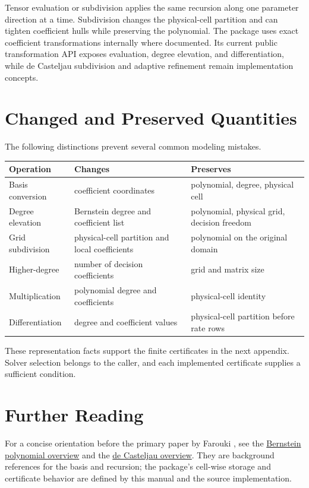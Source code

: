 Tensor evaluation or subdivision applies the same recursion along one parameter direction at a time. Subdivision changes the physical-cell partition and can tighten coefficient hulls while preserving the polynomial. The package uses exact coefficient transformations internally where documented. Its current public transformation API exposes evaluation, degree elevation, and differentiation, while de Casteljau subdivision and adaptive refinement remain implementation concepts.

\section{Changed and Preserved Quantities}

The following distinctions prevent several common modeling mistakes.

\begin{tabularx}{\textwidth}{@{}p{}Y Y@{}}
\toprule
Operation & Changes & Preserves \\
\midrule
Basis conversion & coefficient coordinates & polynomial, degree, physical cell \\
Degree elevation & Bernstein degree and coefficient list & polynomial, physical grid, decision freedom \\
Grid subdivision & physical-cell partition and local coefficients & polynomial on the original domain \\
Higher-degree  & number of decision coefficients & grid and matrix size \\
Multiplication & polynomial degree and coefficients & physical-cell identity \\
Differentiation & degree and coefficient values & physical-cell partition before rate rows \\
\bottomrule
\end{tabularx}

These representation facts support the finite certificates in the next appendix. Solver selection belongs to the caller, and each implemented certificate supplies a sufficient condition.

\section{Further Reading}
For a concise orientation before the primary paper by Farouki \cite{farouki2012}, see the \href{https://en.wikipedia.org/wiki/Bernstein_polynomial}{Bernstein polynomial overview} and the \href{https://en.wikipedia.org/wiki/De_Casteljau%27s_algorithm}{de Casteljau overview}. They are background references for the basis and recursion; the package's cell-wise storage and certificate behavior are defined by this manual and the source implementation.
